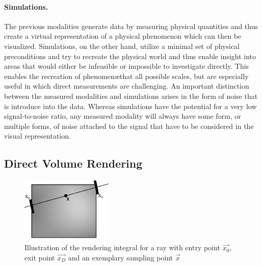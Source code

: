 \paragraph{Simulations. }  The previous modalities generate data by measuring physical quantities and thus create a virtual representation of a physical phenomenon which can then be visualized.  Simulations, on the other hand, utilize a minimal set of physical preconditions and try to recreate the physical world and thus enable insight into areas that would either be infeasible or impossible to investigate directly.  This enables the recreation of phenomen\ae that all possible scales, but are especially useful in which direct measurements are challenging.  An important distinction between the measured modalities and simulations arises in the form of noise that is introduce into the data.  Whereas simulations have the potential for a very low signal-to-noise ratio, any measured modality will always have some form, or multiple forms, of noise attached to the signal that have to be considered in the visual representation.



\subsection{Direct Volume Rendering} \label{cha:intro:vp:dvr}

\begin{figure}
\centering
\includegraphics[width=0.39\textwidth]{figures/intro/rendering_integral.pdf}
\caption{Illustration of the rendering integral for a ray with entry point $\vec{x_0}$, exit point $\vec{x_D}$ and an exemplary sampling point $\vec{x}$}
\label{fig:intro:dvr}
\end{figure}


